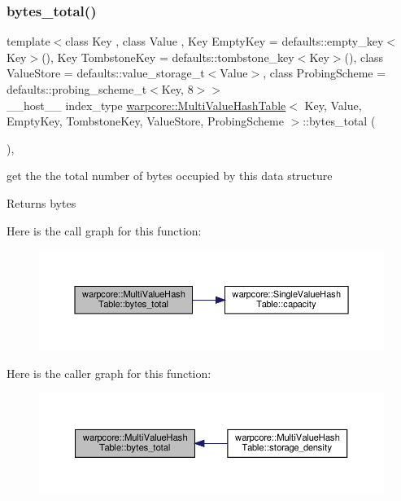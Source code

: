 \subsubsection{\texorpdfstring{bytes\+\_\+total()}{bytes\_total()}}
{\footnotesize\ttfamily template$<$class Key , class Value , Key Empty\+Key = defaults\+::empty\+\_\+key$<$\+Key$>$(), Key Tombstone\+Key = defaults\+::tombstone\+\_\+key$<$\+Key$>$(), class Value\+Store  = defaults\+::value\+\_\+storage\+\_\+t$<$\+Value$>$, class Probing\+Scheme  = defaults\+::probing\+\_\+scheme\+\_\+t$<$\+Key, 8$>$$>$ \\
\+\_\+\+\_\+host\+\_\+\+\_\+ index\+\_\+type \hyperlink{classwarpcore_1_1MultiValueHashTable}{warpcore\+::\+Multi\+Value\+Hash\+Table}$<$ Key, Value, Empty\+Key, Tombstone\+Key, Value\+Store, Probing\+Scheme $>$\+::bytes\+\_\+total (\begin{DoxyParamCaption}{ }\end{DoxyParamCaption})\hspace{0.3cm}{\ttfamily [inline]}, {\ttfamily [noexcept]}}



get the the total number of bytes occupied by this data structure 

\begin{DoxyReturn}{Returns}
bytes 
\end{DoxyReturn}
Here is the call graph for this function\+:
\nopagebreak
\begin{figure}[H]
\begin{center}
\leavevmode
\includegraphics[width=350pt]{classwarpcore_1_1MultiValueHashTable_a99e15b4fe9bfa63f8b1c823a3c030971_cgraph}
\end{center}
\end{figure}
Here is the caller graph for this function\+:
\nopagebreak
\begin{figure}[H]
\begin{center}
\leavevmode
\includegraphics[width=350pt]{classwarpcore_1_1MultiValueHashTable_a99e15b4fe9bfa63f8b1c823a3c030971_icgraph}
\end{center}
\end{figure}
\mbox{\label{classwarpcore_1_1MultiValueHashTable_a158b338a5c798cc0775fd8874bc6e571}} 
